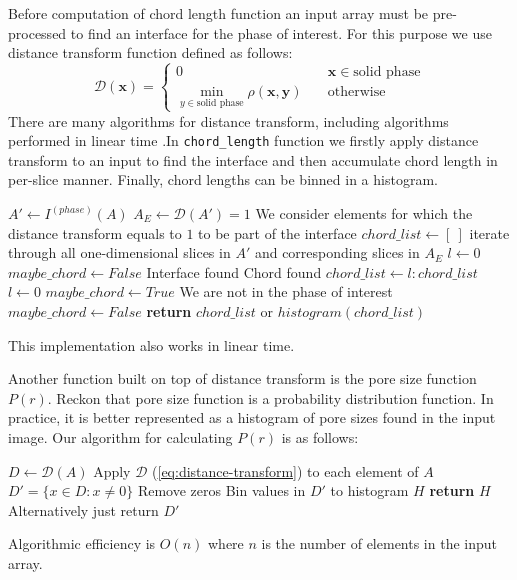 \documentclass[reprint,amsmath,amssymb,aps,pre,showkeys,showpacs,nofootinbib]{revtex4-1}
\newcommand{\code}[1]{\colorbox{light-gray}{\texttt{#1}}}
\begin{document}
Before computation of chord length function an input array must be pre-processed
to find an interface for the phase of interest. For this purpose we use
distance transform function defined as follows:
\begin{equation}
  \mathcal{D}(\bm{x})= \left\{
  \begin{array}{ll}
    0 & \quad \bm{x} \in \text{solid phase} \\
    \min\limits_{y \in \text{solid phase}} \rho(\bm{x},\bm{y}) & \quad \text{otherwise}
  \end{array}
\right. \label{eq:distance-transform}
\end{equation}
There are many algorithms for distance transform, including algorithms performed
in linear time \cite{DT}.In \code{chord\_length} function we firstly apply
distance transform to an input to find the interface and then accumulate chord
length in per-slice manner. Finally, chord lengths can be binned in a histogram.
\begin{algorithmic}[1]
    \State $A' \gets I^{(phase)}(A)$
    \State $A_E \gets \mathcal{D}(A') = 1$
    \Comment We consider elements for which the distance transform equals to $1$
    to be part of the interface
    \State $chord\_list \gets [\ ]$
      \Comment iterate through all one-dimensional slices in $A'$ and
      corresponding slices in $A_E$
      \State $l \gets 0$
      \State $maybe\_chord \gets False$
          \Comment Interface found
            \Comment Chord found
            \State $chord\_list \gets l:chord\_list$
          \EndIf
          \State $l \gets 0$
          \State $maybe\_chord \gets True$
          \Comment We are not in the phase of interest
          \State $maybe\_chord \gets False$
        \EndIf
      \EndFor
    \EndFor
    \State \textbf{return} $chord\_list$ or $histogram(chord\_list)$
  \EndProcedure
\end{algorithmic}
This implementation also works in linear time.

Another function built on top of distance transform is the pore size function
$P(r)$. Reckon that pore size function is a probability distribution
function. In practice, it is better represented as a histogram of pore sizes
found in the input image. Our algorithm for calculating $P(r)$ is as follows:
\begin{algorithmic}[1]
    \State $D \gets \mathcal{D}(A)$
    \Comment Apply $\mathcal{D}$ (\cref{eq:distance-transform}) to each element of $A$
    \State $D' = \{ x \in D: x \ne 0\}$
    \Comment Remove zeros
    \State Bin values in $D'$ to histogram $H$
    \State \textbf{return} $H$
    \Comment Alternatively just return $D'$
  \EndProcedure
\end{algorithmic}
Algorithmic efficiency is $O(n)$ where $n$ is the number of elements in the
input array.
\end{document}
